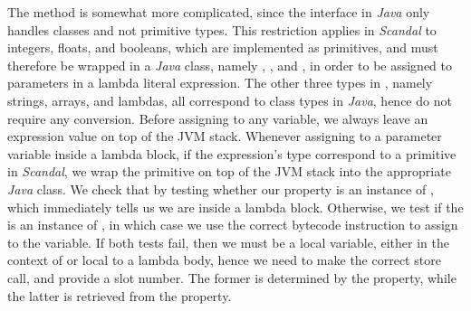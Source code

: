 The  method is somewhat more complicated, since the  interface in \emph{Java} only handles classes and not primitive types. This restriction applies in \emph{Scandal} to integers, floats, and booleans, which are implemented as primitives, and must therefore be wrapped in a \emph{Java} class, namely , , and , in order to be assigned to parameters in a lambda literal expression. The other three types in , namely strings, arrays, and lambdas, all correspond to class types in \emph{Java}, hence do not require any conversion. Before assigning to any variable, we always leave an expression value on top of the JVM stack. Whenever assigning to a parameter variable inside a lambda block, if the expression's type correspond to a primitive in \emph{Scandal}, we wrap the primitive on top of the JVM stack into the appropriate \emph{Java} class. We check that by testing whether our  property is an instance of , which immediately tells us we are inside a lambda block. Otherwise, we test if the  is an instance of , in which case we use the correct bytecode instruction to assign to the variable. If both tests fail, then we must be a local variable, either in the context of  or local to a lambda body, hence we need to make the correct store call, and provide a slot number. The former is determined by the  property, while the latter is retrieved from the  property.

